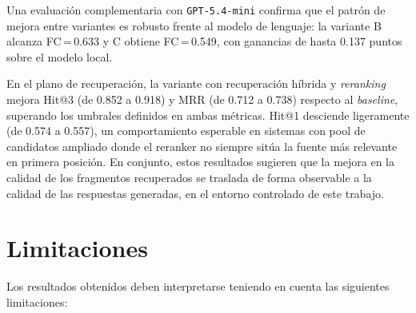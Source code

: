 Una evaluación complementaria con \texttt{GPT-5.4-mini} confirma que el patrón de mejora entre variantes es robusto frente al modelo de lenguaje: la variante B alcanza FC\,=\,0.633 y C obtiene FC\,=\,0.549, con ganancias de hasta 0.137 puntos sobre el modelo local.

En el plano de recuperación, la variante con recuperación híbrida y \textit{reranking} mejora Hit@3 (de 0.852 a 0.918) y MRR (de 0.712 a 0.738) respecto al \textit{baseline}, superando los umbrales definidos en ambas métricas. Hit@1 desciende ligeramente (de 0.574 a 0.557), un comportamiento esperable en sistemas con pool de candidatos ampliado donde el reranker no siempre sitúa la fuente más relevante en primera posición. En conjunto, estos resultados sugieren que la mejora en la calidad de los fragmentos recuperados se traslada de forma observable a la calidad de las respuestas generadas, en el entorno controlado de este trabajo. 

\section{Limitaciones}\label{sec:limitaciones}

Los resultados obtenidos deben interpretarse teniendo en cuenta las siguientes limitaciones:

